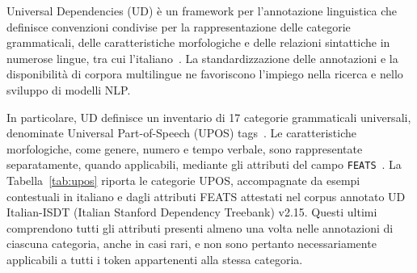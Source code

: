 \documentclass[12pt,a4paper]{report}
\begin{document}
Universal Dependencies (UD) è un framework per l'annotazione linguistica che definisce convenzioni condivise per la rappresentazione delle categorie grammaticali, delle caratteristiche morfologiche e delle relazioni sintattiche in numerose lingue, tra cui l'italiano~\cite{ud}. La standardizzazione delle annotazioni e la disponibilità di corpora multilingue ne favoriscono l'impiego nella ricerca e nello sviluppo di modelli NLP.

In particolare, UD definisce un inventario di 17 categorie grammaticali universali, denominate Universal Part-of-Speech (UPOS) tags~\cite{upos}. Le caratteristiche morfologiche, come genere, numero e tempo verbale, sono rappresentate separatamente, quando applicabili, mediante gli attributi del campo \texttt{FEATS}~\cite{conllu}. La Tabella~\ref{tab:upos} riporta le categorie UPOS, accompagnate da esempi contestuali in italiano e dagli attributi FEATS attestati nel corpus annotato UD Italian-ISDT (Italian Stanford Dependency Treebank) v2.15. Questi ultimi comprendono tutti gli attributi presenti almeno una volta nelle annotazioni di ciascuna categoria, anche in casi rari, e non sono pertanto necessariamente applicabili a tutti i token appartenenti alla stessa categoria.
\end{document}

